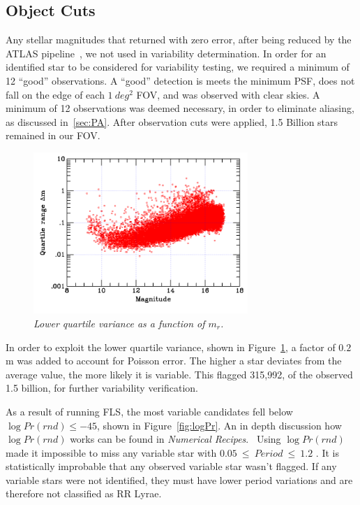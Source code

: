 \documentclass[aps,prb,twocolumn,superscriptaddress]{revtex4-1}
\begin{document}
\subsection{Object Cuts}\label{sec:cuts}

Any stellar magnitudes that returned with zero error, after being reduced by the ATLAS pipeline~\cite{gri}, we not used in variability determination.  
In order for an identified star to be considered for 
variability testing, we required a minimum of 12 ``good'' observations.  A ``good'' detection is meets the minimum 
PSF, does not fall on the edge of each $1~deg^{2}$ FOV, and was observed with clear skies.  A minimum of 12 
observations was deemed necessary, in order to eliminate aliasing, as discussed in~\cref{sec:PA}.  After observation 
cuts were applied, 1.5 Billion stars remained in our FOV.  


\begin{figure}[htb!]
 \centering
 	\includegraphics[width=3.2in]{figures/grpvar.png}
 \caption{\it \small{Lower quartile variance as a function of $m_{r}$.}}
 \label{fig:quart}
\end{figure}
In order to exploit the lower quartile variance, shown in Figure~\ref{fig:quart}, a factor of $0.2$m was added to account for Poisson error.  
The higher a star deviates from the average value, the more likely it is variable.  This flagged 315,992, of the observed 1.5 billion, for 
further variability verification.


As a result of running FLS, the most variable candidates fell below $\log{Pr(rnd)}\leq-45$, shown in Figure~\ref{fig:logPr}.
An in depth discussion how $\log{Pr(rnd)}$ works can be found in \textit{Numerical Recipes}.~\cite{logPr, Numerical}  Using $\log{Pr(rnd)}$ made it impossible 
to miss any variable star with $0.05~\leq~Period~\leq~1.2$ \cite{AAVSO}.  It is statistically improbable that any observed variable star wasn't flagged.  If any variable stars were not identified, they must have lower period variations and are therefore not classified as RR Lyrae.
\end{document}
